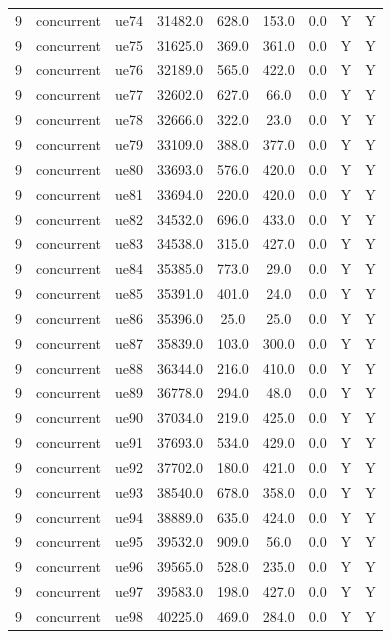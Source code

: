 \begin{table}[ht]
\begin{tabular}{|c|c|c|c|c|c|c|c|c|}
9 & concurrent & ue74 & 31482.0 & 628.0 & 153.0 & 0.0 & Y & Y \\
9 & concurrent & ue75 & 31625.0 & 369.0 & 361.0 & 0.0 & Y & Y \\
9 & concurrent & ue76 & 32189.0 & 565.0 & 422.0 & 0.0 & Y & Y \\
9 & concurrent & ue77 & 32602.0 & 627.0 & 66.0 & 0.0 & Y & Y \\
9 & concurrent & ue78 & 32666.0 & 322.0 & 23.0 & 0.0 & Y & Y \\
9 & concurrent & ue79 & 33109.0 & 388.0 & 377.0 & 0.0 & Y & Y \\
9 & concurrent & ue80 & 33693.0 & 576.0 & 420.0 & 0.0 & Y & Y \\
9 & concurrent & ue81 & 33694.0 & 220.0 & 420.0 & 0.0 & Y & Y \\
9 & concurrent & ue82 & 34532.0 & 696.0 & 433.0 & 0.0 & Y & Y \\
9 & concurrent & ue83 & 34538.0 & 315.0 & 427.0 & 0.0 & Y & Y \\
9 & concurrent & ue84 & 35385.0 & 773.0 & 29.0 & 0.0 & Y & Y \\
9 & concurrent & ue85 & 35391.0 & 401.0 & 24.0 & 0.0 & Y & Y \\
9 & concurrent & ue86 & 35396.0 & 25.0 & 25.0 & 0.0 & Y & Y \\
9 & concurrent & ue87 & 35839.0 & 103.0 & 300.0 & 0.0 & Y & Y \\
9 & concurrent & ue88 & 36344.0 & 216.0 & 410.0 & 0.0 & Y & Y \\
9 & concurrent & ue89 & 36778.0 & 294.0 & 48.0 & 0.0 & Y & Y \\
9 & concurrent & ue90 & 37034.0 & 219.0 & 425.0 & 0.0 & Y & Y \\
9 & concurrent & ue91 & 37693.0 & 534.0 & 429.0 & 0.0 & Y & Y \\
9 & concurrent & ue92 & 37702.0 & 180.0 & 421.0 & 0.0 & Y & Y \\
9 & concurrent & ue93 & 38540.0 & 678.0 & 358.0 & 0.0 & Y & Y \\
9 & concurrent & ue94 & 38889.0 & 635.0 & 424.0 & 0.0 & Y & Y \\
9 & concurrent & ue95 & 39532.0 & 909.0 & 56.0 & 0.0 & Y & Y \\
9 & concurrent & ue96 & 39565.0 & 528.0 & 235.0 & 0.0 & Y & Y \\
9 & concurrent & ue97 & 39583.0 & 198.0 & 427.0 & 0.0 & Y & Y \\
9 & concurrent & ue98 & 40225.0 & 469.0 & 284.0 & 0.0 & Y & Y \\

\end{tabular}
\end{table}
